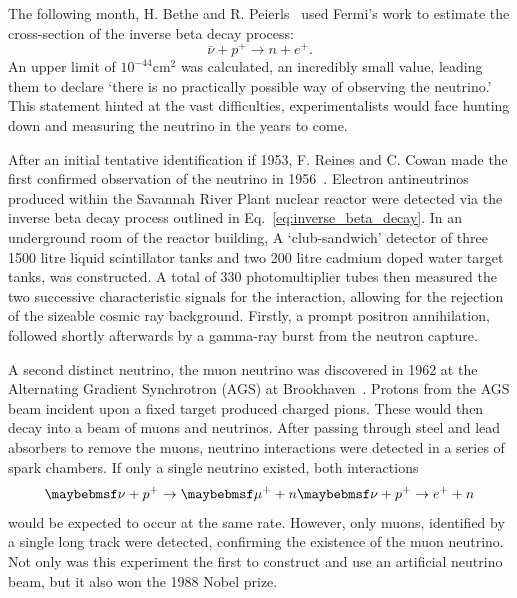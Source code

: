 The following month, H. Bethe and R. Peierls~\cite{bethe1934} used Fermi's work to estimate the
cross-section of the inverse beta decay process:
\begin{equation} %
    \bar{\nu} + p^{+} \rightarrow n + e^{+}.
    \label{eq:inverse_beta_decay}
\end{equation}
An upper limit of $10^{-44} \mathrm{cm}^2$ was calculated, an incredibly small value, leading them
to declare `there is no practically possible way of observing the neutrino.' This statement hinted
at the vast difficulties, experimentalists would face hunting down and measuring the neutrino in
the years to come.

After an initial tentative identification if 1953, F. Reines and C. Cowan made the first confirmed
observation of the neutrino in 1956~\cite{cowan1956}. Electron antineutrinos produced within the
Savannah River Plant nuclear reactor were detected via the inverse beta decay process outlined in
Eq.~\ref{eq:inverse_beta_decay}. In an underground room of the reactor building, A `club-sandwich'
detector of three 1500 litre liquid scintillator tanks and two 200 litre cadmium doped water
target tanks, was constructed. A total of 330 photomultiplier tubes then measured the two
successive characteristic signals for the interaction, allowing for the rejection of the sizeable
cosmic ray background. Firstly, a prompt positron annihilation, followed shortly afterwards by a
gamma-ray burst from the neutron capture.

A second distinct neutrino, the muon neutrino was discovered in 1962 at the Alternating Gradient
Synchrotron (AGS) at Brookhaven~\cite{danby1962}. Protons from the AGS beam incident upon a fixed
target produced charged pions. These would then decay into a beam of muons and neutrinos. After
passing through steel and lead absorbers to remove the muons, neutrino interactions were detected
in a series of spark chambers. If only a single neutrino existed, both interactions
\begin{equation} %
    \nu+p^{+}\rightarrow\mu^{+}+n \\
    \nu+p^{+}\rightarrow e^{+}+n
\end{equation}
would be expected to occur at the same rate. However, only muons, identified by a single long
track were detected, confirming the existence of the muon neutrino. Not only was this experiment
the first to construct and use an artificial neutrino beam, but it also won the 1988 Nobel prize.

